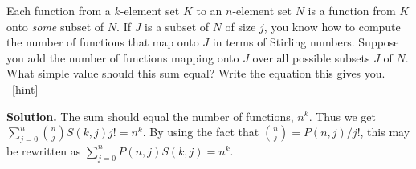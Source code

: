 \documentclass{book}
\begin{document}
\setcounter{project}{204}
\addtocounter{project}{-1}
\begin{activity}[]\label{Stirlingfalling}
\hypertarget{p-1153}{}%
Each function from a \(k\)-element set \(K\) to an \(n\)-element set \(N\) is a function from \(K\) onto \emph{some} subset of \(N\). If \(J\) is a subset of \(N\) of size \(j\), you know how to compute the number of functions that map onto \(J\) in terms of Stirling numbers. Suppose you add the number of functions mapping onto \(J\) over all possible subsets \(J\) of \(N\). What simple value should this sum equal? Write the equation this gives you.%
~\hfill{\tiny\hyperlink{a-204}{[hint]}\hypertarget{q-204}{}}\par\smallskip%
\noindent\textbf{Solution.}\hypertarget{solution-119}{}\quad%
\hypertarget{p-1155}{}%
The sum should equal the number of functions, \(n^k\). Thus we get \(\sum_{j=0}^n \binom{n}{j}S(k,j)j! = n^k\). By using the fact that \(\binom{n}{j}= P(n,j)/j!\), this may be rewritten as \(\sum_{j=0}^n P(n,j)S(k,j) = n^k.\)%
\end{activity}
\end{document}
